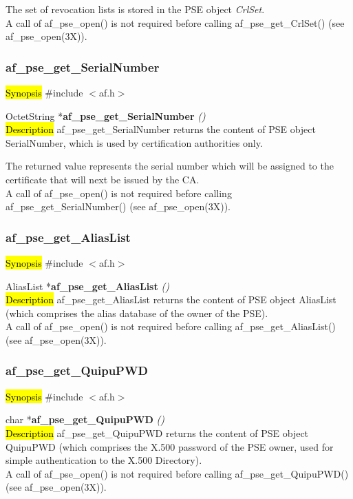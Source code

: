 The set of revocation lists is stored in the PSE object {\em CrlSet}.
\\ [1em]
A call of af\_pse\_open() is not required before calling af\_pse\_get\_CrlSet()
(see af\_pse\_open(3X)).


\subsubsection{af\_pse\_get\_SerialNumber}
\label{af_get_SerialNumber}
\hl{Synopsis}
\#include $<$af.h$>$

OctetString *{\bf af\_pse\_get\_SerialNumber} {\em ()} \\
\hl{Description}
af\_pse\_get\_SerialNumber returns the content of PSE object SerialNumber, which is used by certification authorities only.

The returned value represents the serial number which will be assigned to the certificate 
that will next be issued by the CA.
\\ [1em]
A call of af\_pse\_open() is not required before calling af\_pse\_get\_SerialNumber()
(see af\_pse\_open(3X)).


\subsubsection{af\_pse\_get\_AliasList}
\label{af_get_AliasList}
\hl{Synopsis}
\#include $<$af.h$>$

AliasList *{\bf af\_pse\_get\_AliasList} {\em ()} \\
\hl{Description}
af\_pse\_get\_AliasList returns the content of PSE object AliasList (which
comprises the alias database of the owner of the PSE).
\\ [1em]
A call of af\_pse\_open() is not required before calling af\_pse\_get\_AliasList()
(see af\_pse\_open(3X)).


\subsubsection{af\_pse\_get\_QuipuPWD}
\label{af_get_QuipuPWD}
\hl{Synopsis}
\#include $<$af.h$>$

char *{\bf af\_pse\_get\_QuipuPWD} {\em ()} \\
\hl{Description}
af\_pse\_get\_QuipuPWD returns the content of PSE object QuipuPWD (which
comprises the X.500 password of the PSE owner, used for simple authentication to the
X.500 Directory).
\\ [1em]
A call of af\_pse\_open() is not required before calling af\_pse\_get\_QuipuPWD()
(see af\_pse\_open(3X)).


